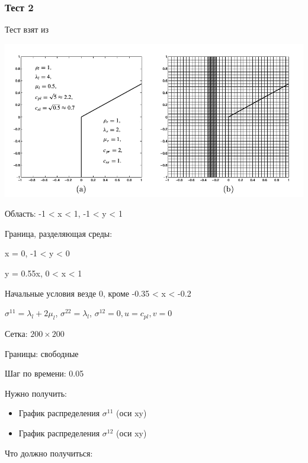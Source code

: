\documentclass{article}
\begin{document}


\newpage
\subsubsection{Тест 2}

Тест взят из \cite{finite}

\includegraphics[scale=0.5]{2D_seismic_tests/2.png}

Область: -1 < x < 1, -1 < y < 1

Граница, разделяющая среды:

x = 0, -1 < y < 0

y = 0.55x, 0 < x < 1
		
Начальные условия везде 0, кроме -0.35 < x < -0.2

$\sigma^{11} = \lambda_l+2\mu_l$, $\sigma^{22} = \lambda_l$, $\sigma^{12} = 0, u = c_{pl}, v = 0$

Сетка: $200\times200$

Границы: свободные

Шаг по времени: 0.05

Нужно получить: 

\begin{itemize}
\item График распределения $\sigma^{11}$ (оси xy)

\item График распределения $\sigma^{12}$ (оси xy)

\end{itemize}

Что должно получиться: 
\end{document}
